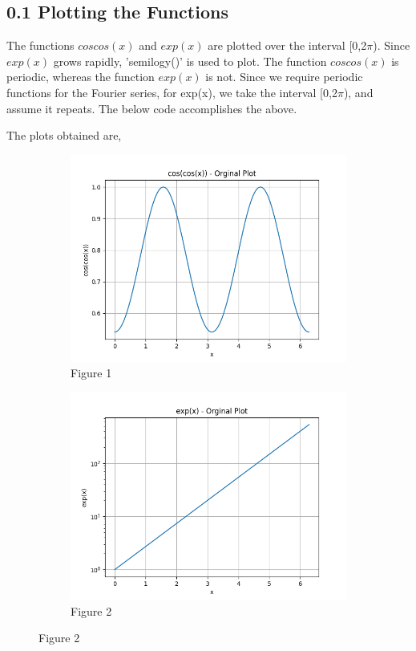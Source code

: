 \documentclass[12pt, a4paper]{report}
\begin{document}
\subsection{0.1	Plotting the Functions}
The functions $coscos(x)$ and $exp(x)$ are plotted over the interval [0,2$\pi$). Since $exp(x)$ grows rapidly, {\selectfont
'semilogy()'
} is used to plot. The function $coscos(x)$ is periodic, whereas the function $exp(x)$ is not. Since we require periodic functions for the Fourier series, for exp(x), we take the interval [0,2$\pi$), and assume it repeats. The below code accomplishes the above.
\
\noindent

The plots obtained are,
\begin{figure}[h!]

\begin{subfigure}{0.55\textwidth}
    \centering
    \includegraphics[scale=0.9,width=\linewidth]{figure1.png} 
    \caption{Figure 1}
    \label{fig:my_label}
\end{subfigure}
\begin{subfigure}{0.55\textwidth}
    \centering
    \includegraphics[scale=0.9,width=\linewidth]{figure2.png} 
    \caption{Figure 2}
    \label{fig:image2}
\end{subfigure}


\end{figure}
\end{document}
